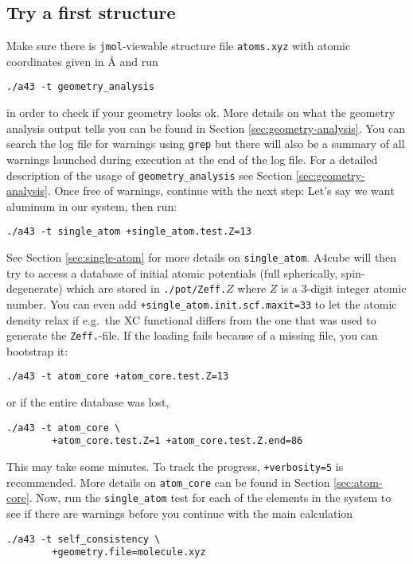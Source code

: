 \documentclass[oribibl]{llncs}
\newcommand{\ttt}[1]{\texttt{#1}}
\newcommand{\codename}{A4cube}
\begin{document}
\subsection{Try a first structure} \label{sec:first-steps}
%
Make sure there is \ttt{jmol}-viewable structure file \ttt{atoms.xyz}
with atomic coordinates given in \AA{} and run
\begin{verbatim}
./a43 -t geometry_analysis
\end{verbatim}
in order to check if your geometry looks ok.
More details on what the geometry analysis output tells you can be found in Section \ref{sec:geometry-analysis}.
You can search the log file for warnings using \ttt{grep} but
there will also be a summary of all warnings launched during execution at the end of the log file.
For a detailed description of the usage of \ttt{geometry\_analysis} see Section \ref{sec:geometry-analysis}.
%
\noindent
Once free of warnings, continue with the next step:
Let's say we want aluminum in our system, then run:
\begin{verbatim}
./a43 -t single_atom +single_atom.test.Z=13
\end{verbatim}
See Section \ref{sec:single-atom} for more details on \ttt{single\_atom}.
%
\codename{} will then try to access a database of initial atomic potentials
(full spherically, spin-degenerate) which are stored in \ttt{./pot/Zeff.}$Z$
where $Z$ is a 3-digit integer atomic number.
You can even add \ttt{+single\_atom.init.scf.maxit=33} to let the atomic density relax if e.g.~the \ac{XC} functional differs from the one that was used to generate the \ttt{Zeff.}-file.
If the loading fails because of a missing file, you can bootstrap it:
\begin{verbatim}
./a43 -t atom_core +atom_core.test.Z=13
\end{verbatim}
or if the entire database was lost,
\begin{verbatim}
./a43 -t atom_core \
        +atom_core.test.Z=1 +atom_core.test.Z.end=86
\end{verbatim}
This may take some minutes. To track the progress, \ttt{+verbosity=5} is recommended.
More details on \ttt{atom\_core} can be found in Section \ref{sec:atom-core}.
\todo[inline]{OpenMP would be good here}
%
\noindent
Now, run the \ttt{single\_atom} test for each of the elements in the system 
to see if there are warnings before you continue with the main calculation
\begin{verbatim}
./a43 -t self_consistency \
        +geometry.file=molecule.xyz
\end{verbatim}
%
\end{document}
